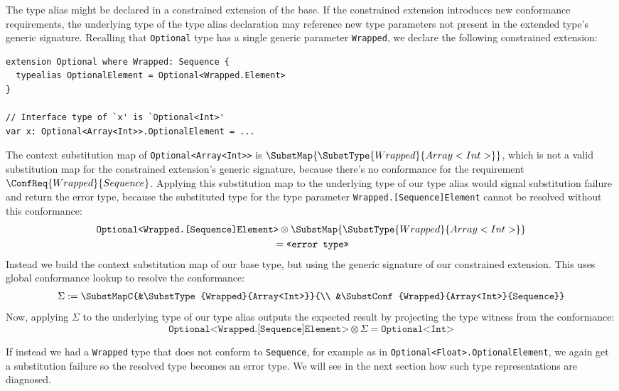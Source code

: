 \documentclass[../generics]{subfiles}
\begin{document}
The type alias might be declared in a constrained extension of the base. If the constrained extension introduces new conformance requirements, the underlying type of the type alias declaration may reference new type parameters not present in the extended type's generic signature. Recalling that \texttt{Optional} type has a single generic parameter \texttt{Wrapped}, we declare the following constrained extension:
\begin{Verbatim}
extension Optional where Wrapped: Sequence {
  typealias OptionalElement = Optional<Wrapped.Element>
}

// Interface type of `x' is `Optional<Int>'
var x: Optional<Array<Int>>.OptionalElement = ...
\end{Verbatim}
The context substitution map of \texttt{Optional<Array<Int>>} is $\SubstMap{\SubstType{Wrapped}{Array<Int>}}$, which is not a valid substitution map for the constrained extension's generic signature, because there's no conformance for the requirement $\ConfReq{Wrapped}{Sequence}$. Applying this substitution map to the underlying type of our type alias would signal substitution failure and return the error type, because the substituted type for the type parameter \texttt{Wrapped.[Sequence]Element} cannot be resolved without this conformance:
\begin{multline*}\texttt{Optional<Wrapped.[Sequence]Element>}\otimes\SubstMap{\SubstType{Wrapped}{Array<Int>}}\\
{} =\texttt{<<error type>>}
\end{multline*}
Instead we build the context substitution map of our base type, but using the generic signature of our constrained extension. This uses global conformance lookup to resolve the conformance:
\begin{align*}
\Sigma := \SubstMapC{&\SubstType{Wrapped}{Array<Int>}}{\\
&\SubstConf{Wrapped}{Array<Int>}{Sequence}}
\end{align*}
Now, applying $\Sigma$ to the underlying type of our type alias outputs the expected result by projecting the type witness from the conformance:
\[\texttt{Optional<Wrapped.[Sequence]Element>}\otimes\Sigma = \texttt{Optional<Int>}\]

If instead we had a \texttt{Wrapped} type that does not conform to \texttt{Sequence}, for example as in \texttt{Optional<Float>.OptionalElement}, we again get a substitution failure so the resolved type becomes an error type. We will see in the next section how such type representations are diagnosed.
\end{document}
